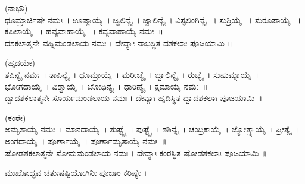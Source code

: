(ನಾಭೌ)\\
ಧೂಮ್ರಾರ್ಚಿಷೇ   ನಮಃ~। ಊಷ್ಮಾಯೈ~। ಜ್ವಲಿನ್ಯೈ~। ಜ್ವಾಲಿನ್ಯೈ~। ವಿಸ್ಫಲಿಂಗಿನ್ಯೈ ~। ಸುಶ್ರಿಯೈ ~। ಸುರೂಪಾಯೈ ~। ಕಪಿಲಾಯೈ ~। ಹವ್ಯವಾಹಾಯೈ ~। ಕವ್ಯವಾಹಾಯೈ ನಮಃ~॥\\
ದಶಕಲಾತ್ಮನೇ ವಹ್ನಿಮಂಡಲಾಯ ನಮಃ । ದೇವ್ಯಾಃ ನಾಭಿಸ್ಥಿತ ದಶಕಲಾಃ ಪೂಜಯಾಮಿ ॥

(ಹೃದಯೇ)\\
ತಪಿನ್ಯೈ ನಮಃ~। ತಾಪಿನ್ಯೈ~। ಧೂಮ್ರಾಯೈ~। ಮರೀಚ್ಯೈ~। ಜ್ವಾಲಿನ್ಯೈ~। ರುಚ್ಯೈ~। ಸುಷುಮ್ನಾಯೈ~। ಭೋಗದಾಯೈ~। ವಿಶ್ವಾಯೈ~। ಬೋಧಿನ್ಯೈ~। ಧಾರಿಣ್ಯೈ~। ಕ್ಷಮಾಯೈ ನಮಃ~॥\\
ದ್ವಾದಶಕಲಾತ್ಮನೇ ಸೂರ್ಯಮಂಡಲಾಯ ನಮಃ । ದೇವ್ಯಾಃ ಹೃದಿಸ್ಥಿತ ದ್ವಾದಶಕಲಾಃ ಪೂಜಯಾಮಿ ॥

(ಕಂಠೇ)\\
ಅಮೃತಾಯೈ ನಮಃ~। ಮಾನದಾಯೈ~। ತುಷ್ಟ್ಯೈ~। ಪುಷ್ಟ್ಯೈ~। ಶಶಿನ್ಯೈ~। ಚಂದ್ರಿಕಾಯೈ~। ಜ್ಯೋತ್ಸ್ನಾಯೈ~। ಪ್ರೀತ್ಯೈ~। ಅಂಗದಾಯೈ~। ಪೂರ್ಣಾಯೈ~। ಪೂರ್ಣಾಮೃತಾಯೈ ನಮಃ~॥\\
ಷೋಡಶಕಲಾತ್ಮನೇ ಸೋಮಮಂಡಲಾಯ ನಮಃ । ದೇವ್ಯಾಃ ಕಂಠಸ್ಥಿತ ಷೋಡಶಕಲಾಃ ಪೂಜಯಾಮಿ ॥

ಮುಖೋದ್ಭವ ಚತುಃಷಷ್ಟಿಯೋಗಿನೀ ಪೂಜಾಂ ಕರಿಷ್ಯೇ ।
